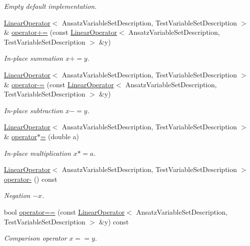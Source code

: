\begin{DoxyCompactItemize}
\begin{DoxyCompactList}\small\item\em Empty default implementation. \end{DoxyCompactList}\item 
\hyperlink{classSpacy_1_1Kaskade_1_1LinearOperator}{Linear\+Operator}$<$ Ansatz\+Variable\+Set\+Description, Test\+Variable\+Set\+Description $>$ \& \hyperlink{classSpacy_1_1AddArithmeticOperators_afad1d01e1e8c6f75290ac46d9b047ea8}{operator+=} (const \hyperlink{classSpacy_1_1Kaskade_1_1LinearOperator}{Linear\+Operator}$<$ Ansatz\+Variable\+Set\+Description, Test\+Variable\+Set\+Description $>$ \&y)
\begin{DoxyCompactList}\small\item\em In-\/place summation $ x+=y$. \end{DoxyCompactList}\item 
\hyperlink{classSpacy_1_1Kaskade_1_1LinearOperator}{Linear\+Operator}$<$ Ansatz\+Variable\+Set\+Description, Test\+Variable\+Set\+Description $>$ \& \hyperlink{classSpacy_1_1AddArithmeticOperators_a9fa91e177d13203cfe8cfa991c64ca36}{operator-\/=} (const \hyperlink{classSpacy_1_1Kaskade_1_1LinearOperator}{Linear\+Operator}$<$ Ansatz\+Variable\+Set\+Description, Test\+Variable\+Set\+Description $>$ \&y)
\begin{DoxyCompactList}\small\item\em In-\/place subtraction $ x-=y$. \end{DoxyCompactList}\item 
\hyperlink{classSpacy_1_1Kaskade_1_1LinearOperator}{Linear\+Operator}$<$ Ansatz\+Variable\+Set\+Description, Test\+Variable\+Set\+Description $>$ \& \hyperlink{classSpacy_1_1AddArithmeticOperators_a1d3db95b24fd2bc1de712c9e04c47e2f}{operator$\ast$=} (double a)
\begin{DoxyCompactList}\small\item\em In-\/place multiplication $ x*=a$. \end{DoxyCompactList}\item 
\hyperlink{classSpacy_1_1Kaskade_1_1LinearOperator}{Linear\+Operator}$<$ Ansatz\+Variable\+Set\+Description, Test\+Variable\+Set\+Description $>$ \hyperlink{classSpacy_1_1AddArithmeticOperators_a5acd030bf265d130983fd6e3c5b68be5}{operator-\/} () const
\begin{DoxyCompactList}\small\item\em Negation $ -x$. \end{DoxyCompactList}\item 
bool \hyperlink{classSpacy_1_1AddArithmeticOperators_a5ff1909f49f4a705d69663dc2d4b6316}{operator==} (const \hyperlink{classSpacy_1_1Kaskade_1_1LinearOperator}{Linear\+Operator}$<$ Ansatz\+Variable\+Set\+Description, Test\+Variable\+Set\+Description $>$ \&y) const
\begin{DoxyCompactList}\small\item\em Comparison operator $ x==y$. \end{DoxyCompactList}\end{DoxyCompactItemize}



